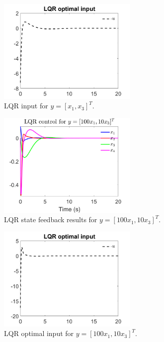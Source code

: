 \documentclass[12pt]{article}
\numberwithin{equation}{section}
\begin{document}
\begin{figure}
    \centering
    \includegraphics[width=0.6\textwidth]{lqr/lqr_2.png}
    \caption{LQR input for $y = [x_1, x_3]^T$.}
    \label{fig:lqr2}
\end{figure}

\begin{figure}
    \centering
    \includegraphics[width=0.6\textwidth]{lqr/lqr_3.png}
    \caption{LQR state feedback results for $y = [100 x_1, 10 x_3]^T$.}
    \label{fig:lqr3}
\end{figure}

\begin{figure}
    \centering
    \includegraphics[width=0.6\textwidth]{lqr/lqr_4.png}
    \caption{LQR optimal input for $y = [100 x_1, 10 x_3]^T$.}
    \label{fig:lqr4}
\end{figure}
\end{document}
